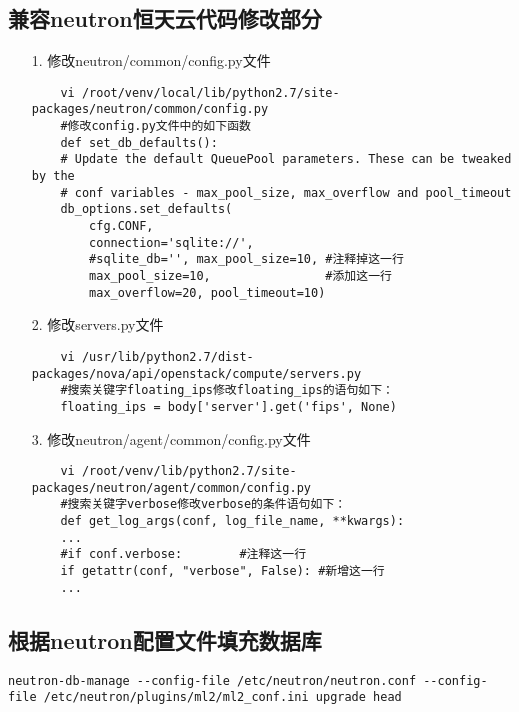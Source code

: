 \documentclass[a4paper,left=1.5cm,right=1.5cm,11pt]{article}
\begin{document}
\subsection{兼容neutron恒天云代码修改部分}
\begin{itemize}
	\item[1.]修改neutron/common/config.py文件
	\begin{lstlisting}
	vi /root/venv/local/lib/python2.7/site-packages/neutron/common/config.py
	#修改config.py文件中的如下函数
	def set_db_defaults():
    # Update the default QueuePool parameters. These can be tweaked by the
    # conf variables - max_pool_size, max_overflow and pool_timeout
    db_options.set_defaults(
        cfg.CONF,
        connection='sqlite://',
        #sqlite_db='', max_pool_size=10, #注释掉这一行
        max_pool_size=10,                #添加这一行
        max_overflow=20, pool_timeout=10)
	\end{lstlisting}
	\item[2.]修改servers.py文件
	\begin{lstlisting}
	vi /usr/lib/python2.7/dist-packages/nova/api/openstack/compute/servers.py
	#搜索关键字floating_ips修改floating_ips的语句如下：
	floating_ips = body['server'].get('fips', None)
	\end{lstlisting}
	\item[3.]修改neutron/agent/common/config.py文件
	\begin{lstlisting}
	vi /root/venv/lib/python2.7/site-packages/neutron/agent/common/config.py
	#搜索关键字verbose修改verbose的条件语句如下：
	def get_log_args(conf, log_file_name, **kwargs):
    ...
    #if conf.verbose:        #注释这一行
    if getattr(conf, "verbose", False): #新增这一行
	...
	\end{lstlisting}
\end{itemize}
\subsection{根据neutron配置文件填充数据库}
\begin{lstlisting}
neutron-db-manage --config-file /etc/neutron/neutron.conf --config-file /etc/neutron/plugins/ml2/ml2_conf.ini upgrade head
\end{lstlisting}
\end{document}

